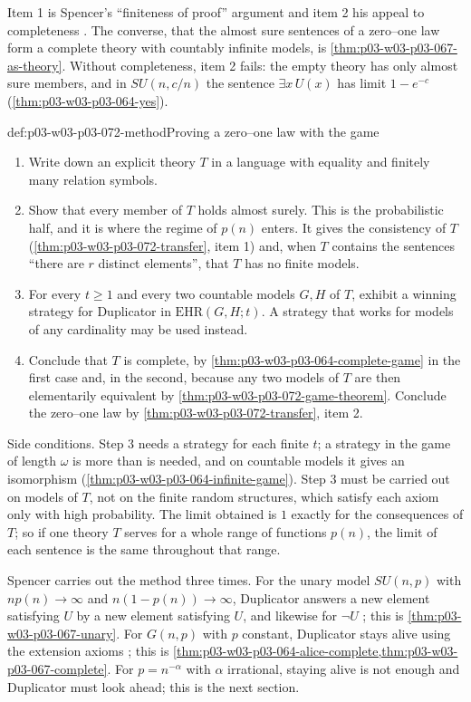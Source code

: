 Item 1 is Spencer's ``finiteness of proof'' argument and item 2 his
appeal to completeness \cite[p.~3]{Spencer2007LogicRandomStructuresAuthor}.
The converse, that the almost sure sentences of a zero--one law form a
complete theory with countably infinite models, is
\cref{thm:p03-w03-p03-067-as-theory}.  Without completeness, item 2 fails:
the empty theory has only almost sure members, and in \(SU(n,c/n)\) the
sentence \(\exists x\,U(x)\) has limit \(1-e^{-c}\)
(\cref{thm:p03-w03-p03-064-yes}).

\begin{hbmethod}{def:p03-w03-p03-072-method}{Proving a zero--one law with the game}
\begin{enumerate}
\item Write down an explicit theory \(T\) in a language with equality and
  finitely many relation symbols.
\item Show that every member of \(T\) holds almost surely.  This is the
  probabilistic half, and it is where the regime of \(p(n)\) enters.  It
  gives the consistency of \(T\) (\cref{thm:p03-w03-p03-072-transfer},
  item 1) and, when \(T\) contains the sentences ``there are \(r\) distinct
  elements'', that \(T\) has no finite models.
\item For every \(t\geq1\) and every two countable models \(G,H\) of \(T\),
  exhibit a winning strategy for Duplicator in \(\mathrm{EHR}(G,H;t)\).  A
  strategy that works for models of any cardinality may be used instead.
\item Conclude that \(T\) is complete, by
  \cref{thm:p03-w03-p03-064-complete-game} in the first case and, in the
  second, because any two models of \(T\) are then elementarily equivalent
  by \cref{thm:p03-w03-p03-072-game-theorem}.  Conclude the zero--one law by
  \cref{thm:p03-w03-p03-072-transfer}, item 2.
\end{enumerate}
Side conditions.  Step 3 needs a strategy for each finite \(t\); a
strategy in the game of length \(\omega\) is more than is needed, and on
countable models it gives an isomorphism
(\cref{thm:p03-w03-p03-064-infinite-game}).  Step 3 must be carried out on
models of \(T\), not on the finite random structures, which satisfy each
axiom only with high probability.  The limit obtained is \(1\) exactly for
the consequences of \(T\); so if one theory \(T\) serves for a whole range
of functions \(p(n)\), the limit of each sentence is the same throughout
that range.
\end{hbmethod}

Spencer carries out the method three times.  For the unary model
\(SU(n,p)\) with \(np(n)\to\infty\) and \(n(1-p(n))\to\infty\), Duplicator
answers a new element satisfying \(U\) by a new element satisfying \(U\),
and likewise for \(\neg U\)
\cite[p.~3]{Spencer2007LogicRandomStructuresAuthor}; this is
\cref{thm:p03-w03-p03-067-unary}.  For \(G(n,p)\) with \(p\) constant,
Duplicator stays alive using the extension axioms
\cite[pp.~12--13]{Spencer2007LogicRandomStructuresAuthor}; this is
\cref{thm:p03-w03-p03-064-alice-complete,thm:p03-w03-p03-067-complete}.  For
\(p=n^{-\alpha}\) with \(\alpha\) irrational, staying alive is not enough
and Duplicator must look ahead; this is the next section.

